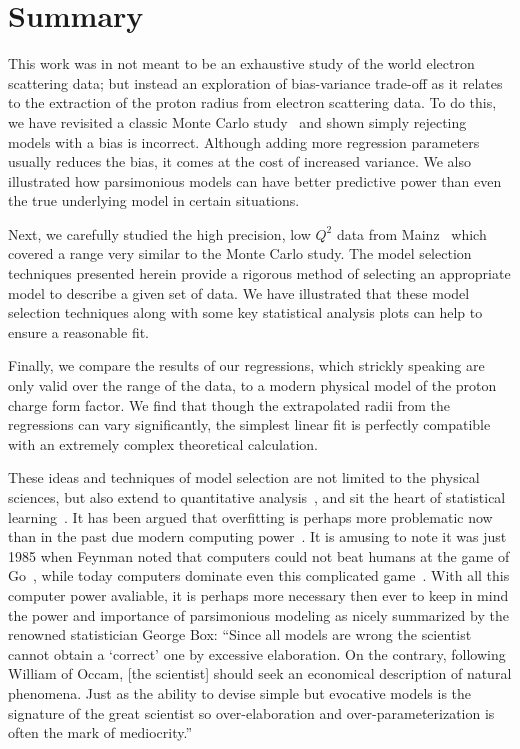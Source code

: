 \documentclass[10pt,aps,prc,twocolumn]{revtex4-1}
\begin{document}
\section{Summary}

This work was in not meant to be an exhaustive study of the world electron scattering data; but 
instead an exploration of bias-variance trade-off as it relates to the extraction of the proton 
radius from electron scattering data.
To do this, we have revisited a classic Monte Carlo study~\cite{Borkowski:1975ume} and shown
simply rejecting models with a bias is incorrect.
Although adding more regression parameters usually reduces the bias, it comes at the cost of increased variance.
We also illustrated how parsimonious models can have better 
predictive power than even the true underlying model in certain situations. 

Next, we carefully studied the high precision, low $Q^2$ data from Mainz~\cite{Bernauer:2010wm} which covered a range
very similar to the Monte Carlo study.  The model selection techniques
presented herein provide a rigorous method of selecting an appropriate model to describe a given set of data.  
We have illustrated that these model selection techniques along with some key statistical 
analysis plots can help to ensure a reasonable fit.   

Finally, we compare the results of our regressions, which strickly speaking are only valid over the
range of the data, to a modern physical model of the proton charge form factor.
We find that though the extrapolated radii from the regressions can vary significantly, the simplest
linear fit is perfectly compatible with an extremely complex theoretical calculation.

These ideas and techniques of model selection are not limited to the physical sciences, but also extend
to quantitative analysis~\cite{Brighton:2015}, and sit the heart of statistical 
learning~\cite{Hastie:2009}.  It has been argued that overfitting is perhaps more problematic now than
in the past due modern computing power~\cite{Cawley:2010}.   It is amusing to note it
was just 1985 when Feynman noted that computers could not beat humans at the
game of Go~\cite{Feynman:2008}, while today computers dominate even this complicated game~\cite{Silver:2016,Barradas:2018}.
With all this computer power avaliable, it is perhaps more necessary then ever
to keep in mind the power and importance of parsimonious modeling as nicely 
summarized by the renowned statistician George Box: 
``Since all models are wrong the scientist cannot obtain a `correct' one
by excessive elaboration.  On the contrary, following William of Occam, 
[the scientist] should seek an economical description of natural phenomena. 
Just as the ability to devise simple but evocative models is the signature of the
great scientist so over-elaboration and over-parameterization is often
the mark of mediocrity.''~\cite{Box76}
\end{document}
